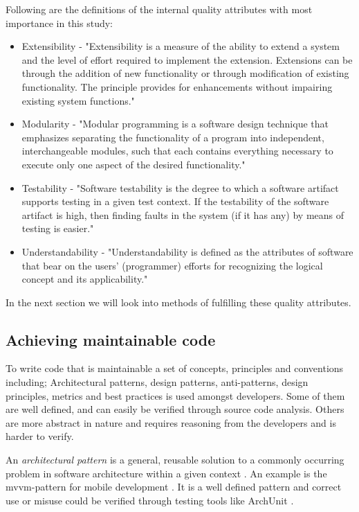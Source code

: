 \documentclass{article}
\begin{document}
Following are the definitions of the internal quality attributes with most importance in this study:
\begin{itemize}
	\item Extensibility - "Extensibility is a measure of the ability to extend a system and the level of effort required to implement the extension. Extensions can be through the addition of new functionality or through modification of existing functionality. The principle provides for enhancements without impairing existing system functions." \cite{Extensib83:online}
    	\item Modularity - "Modular programming is a software design technique that emphasizes separating the functionality of a program into independent, interchangeable modules, such that each contains everything necessary to execute only one aspect of the desired functionality." \cite{Modularp60:online}
	\item Testability - "Software testability is the degree to which a software artifact supports testing in a given test context. If the testability of the software artifact is high, then finding faults in the system (if it has any) by means of testing is easier." \cite{Software40:online}
	\item Understandability - "Understandability is defined as the attributes of software that bear on the users' (programmer) efforts for recognizing the logical concept and its applicability." \cite{Understa26:online}
\end{itemize}

In the next section we will look into methods of fulfilling these quality attributes.

\subsection{Achieving maintainable code}
To write code that is maintainable a set of concepts, principles and conventions including; Architectural patterns, design patterns, anti-patterns, design principles, metrics and best practices is used amongst developers. Some of them are well defined, and can easily be verified through source code analysis. Others are more abstract in nature and requires reasoning from the developers and is harder to verify.

An \textit{architectural pattern} is a general, reusable solution to a commonly occurring problem in software architecture within a given context \cite{architecturalpattern}. An example is the \gls{mvvm}-pattern for mobile development \cite{mvvm}. It is a well defined pattern and correct use or misuse could be verified through testing tools like ArchUnit \cite{archunit}. 
\end{document}
